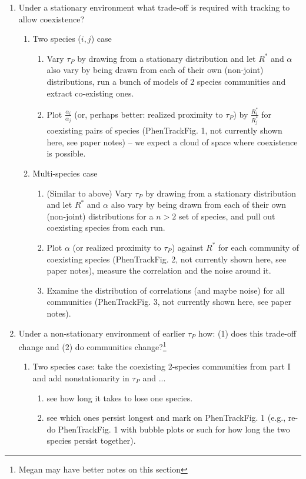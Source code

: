 \documentclass[11pt,letterpaper]{article}
\begin{document}
\begin{enumerate}
\item Under a stationary environment what trade-off is required with tracking to allow coexistence?
\begin{enumerate}
\item Two species ($i, j$) case
\begin{enumerate}
\item Vary $\tau_P$ by drawing from a stationary distribution and let $R^*$ and $\alpha$ also vary by being drawn from each of their own (non-joint) distributions, run a bunch of models of 2 species communities and extract co-existing ones. 
\item Plot $\frac{\alpha_i}{\alpha_j}$ (or, perhaps better: realized proximity to $\tau_P$) by  $\frac{R^{*}_{i}}{R^{*}_{j}}$ for coexisting pairs of species (PhenTrackFig. 1, not currently shown here, see paper notes) -- we expect a cloud of space where coexistence is possible.
\end{enumerate}
\item Multi-species case
\begin{enumerate}
\item (Similar to above) Vary $\tau_P$ by drawing from a stationary distribution and let $R^*$ and $\alpha$ also vary by being drawn from each of their own (non-joint) distributions for a $n>2$ set of species, and pull out coexisting species from each run. 
\item Plot $\alpha$ (or realized proximity to $\tau_P$) against $R^*$ for each community of coexisting species (PhenTrackFig. 2, not currently shown here, see paper notes), measure the correlation and the noise around it.
\item Examine the distribution of correlations (and maybe noise) for all communities (PhenTrackFig. 3, not currently shown here, see paper notes).
\end{enumerate}
\end{enumerate}
\item Under a non-stationary environment of earlier $\tau_P$ how: (1) does this trade-off change and (2) do communities change?\footnote{Megan may have better notes on this section}
\begin{enumerate}
\item Two species case: take the coexisting 2-species communities from part I and add nonstationarity in $\tau_P$ and ...
\begin{enumerate}
\item see how long it takes to lose one species. 
\item see which ones persist longest and mark on PhenTrackFig. 1 (e.g., re-do PhenTrackFig. 1 with bubble plots or such for how long the two species persist together).

\end{enumerate}
\end{enumerate}
\end{enumerate}
\end{document}
